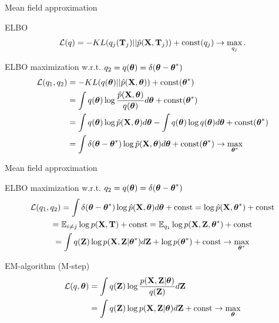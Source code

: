 \documentclass{beamer}
\begin{document}
\begin{frame}{Mean field approximation}
	\begin{block}{ELBO}
		\[
			\mathcal{L} (q) = - KL (q_j(\mathbf{T}_j) || \hat{p}(\mathbf{X}, \mathbf{T}_j))  + \text{const}(q_j) \rightarrow \max_{q_j}.
		\]
	\vspace{-0.3cm}
	\end{block}
	\begin{block}{ELBO maximization w.r.t. $q_2 = q(\boldsymbol{\theta}) = \delta(\boldsymbol{\theta} - \boldsymbol{\theta}^*)$}
		\vspace{-0.3cm}
		\begin{align*}
			\mathcal{L} (q_1, q_2) &= - KL (q(\boldsymbol{\theta}) || \hat{p}(\mathbf{X}, \boldsymbol{\theta}))  + \text{const}(\boldsymbol{\theta}^*) \\ 
			&= \int q (\boldsymbol{\theta}) \log \frac{\hat{p}(\mathbf{X}, \boldsymbol{\theta})}{q(\boldsymbol{\theta})} d\boldsymbol{\theta} + \text{const}(\boldsymbol{\theta}^*) \\
			& = \int q (\boldsymbol{\theta}) \log \hat{p}(\mathbf{X}, \boldsymbol{\theta}) d\boldsymbol{\theta}  - \int q (\boldsymbol{\theta}) \log q(\boldsymbol{\theta}) d\boldsymbol{\theta} + \text{const}(\boldsymbol{\theta}^*) \\
			& = \int \delta(\boldsymbol{\theta} - \boldsymbol{\theta}^*) \log \hat{p}(\mathbf{X}, \boldsymbol{\theta}) d\boldsymbol{\theta} + \text{const}(\boldsymbol{\theta}^*) \rightarrow \max_{\boldsymbol{\theta}^*}
		\end{align*}
		\vspace{-0.3cm}
	\end{block}
\end{frame}
\begin{frame}{Mean field approximation}
	
	\begin{block}{ELBO maximization w.r.t. $q_2 = q(\boldsymbol{\theta}) = \delta(\boldsymbol{\theta} - \boldsymbol{\theta}^*)$}
		\vspace{-0.3cm}
		\begin{multline*}
			\mathcal{L} (q_1, q_2) = \int \delta(\boldsymbol{\theta} - \boldsymbol{\theta}^*) \log \hat{p}(\mathbf{X}, \boldsymbol{\theta}) d\boldsymbol{\theta} + \text{const}
			= \log \hat{p}(\mathbf{X}, \boldsymbol{\theta}^*)  + \text{const} \\
			= \mathbb{E}_{i \neq j} \log p(\mathbf{X}, \mathbf{T}) + \text{const} = \mathbb{E}_{q_1} \log p(\mathbf{X}, \mathbf{Z}, \boldsymbol{\theta}^*) + \text{const} \\
		= \int q(\mathbf{Z}) \log p(\mathbf{X}, \mathbf{Z}|  \boldsymbol{\theta}^*) d\mathbf{Z} + \log p(\boldsymbol{\theta}^*)+ \text{const}\rightarrow \max_{\boldsymbol{\theta}^*}
	\end{multline*}
	\end{block}
	\vspace{-0.3cm}
	\begin{block}{EM-algorithm (M-step)}
		\vspace{-0.3cm}
		 \begin{align*}
		 	\mathcal{L}(q, \boldsymbol{\theta}) &= \int q(\mathbf{Z}) \log \frac{p(\mathbf{X}, \mathbf{Z} | \boldsymbol{\theta})}{q(\mathbf{Z})}d\mathbf{Z} \\
		 	&= \int q(\mathbf{Z}) \log p(\mathbf{X}, \mathbf{Z} | \boldsymbol{\theta}) d\mathbf{Z} + \text{const} \rightarrow \max_{\boldsymbol{\theta}}
		 \end{align*}
	\end{block}
\end{frame}
\end{document}
